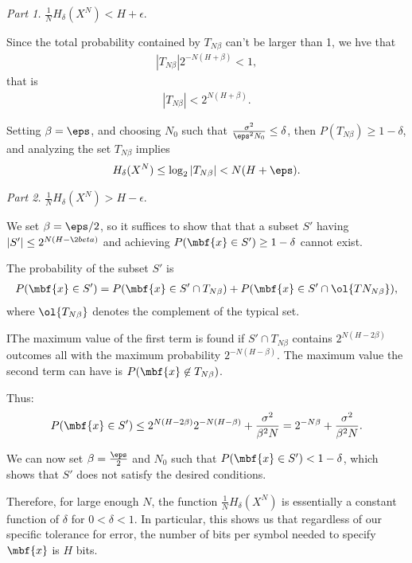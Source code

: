   {\it Part 1.} $\frac{1}{N} H_{\delta}(X^N) < H + \epsilon$.

  Since the total probability contained by $T_{N \beta}$ can't be larger than 1, we hve that
  \begin{align*}
    |T_{N \beta}| 2^{-N (H + \beta)} < 1,
  \end{align*}
  that is
  \begin{align*}
    |T_{N \beta}| < 2^{N (H + \beta)}.
  \end{align*}

  Setting $\beta = \eps$, and choosing $N_0$ such that $\frac{\sigma^2}{\eps^2 N_0} \leq \delta$, then $P(T_{N \beta}) \geq 1 - \delta$, and analyzing the set $T_{N \beta}$ implies
  \begin{align*}
    H_{\delta}(X^N) \leq \log_2 |T_{N \beta}| < N (H + \eps).
  \end{align*}

  {\it Part 2.} $\frac{1}{N} H_{\delta}(X^N) > H - \epsilon$.

  We set $\beta = \eps / 2$, so it suffices to show that that a subset $S'$ having $|S'| \leq 2^{N (H - \2beta)}$ and achieving $P(\mbf{x} \in S') \geq 1 - \delta$ cannot exist.

  The probability of the subset $S'$ is
  \begin{align*}
    P(\mbf{x} \in S') = P(\mbf{x} \in S' \cap T_{N \beta}) + P(\mbf{x} \in S' \cap \ol{TN_{N \beta}}),
  \end{align*}
  where $\ol{T_{N \beta}}$ denotes the complement of the typical set.

  IThe maximum value of the first term is found if $S' \cap T_{N \beta}$ contains $2^{N(H - 2 \beta)}$ outcomes all with the maximum probability $2^{-N (H - \beta)}$.  The maximum value the second term can have is $P(\mbf{x} \not \in T_{N \beta})$.

  Thus:
  \begin{align*}
    P(\mbf{x} \in S') \leq 2^{N (H - 2 \beta)} 2^{-N (H - \beta)} + \frac{\sigma^2}{\beta^2 N} = 2^{-N \beta} + \frac{\sigma^2}{\beta^2 N}.
  \end{align*}

  We can now set $\beta = \frac{\eps}{2}$ and $N_0$ such that $P(\mbf{x} \in S') < 1 - \delta$, which shows that $S'$ does not satisfy the desired conditions.

  Therefore, for large enough $N$, the function $\frac{1}{N} H_{\delta} (X^N)$ is essentially a constant function of $\delta$ for $0 < \delta < 1$. In particular, this shows us that regardless of our specific tolerance for error, the number of bits per symbol needed to specify $\mbf{x}$ is $H$ bits.

